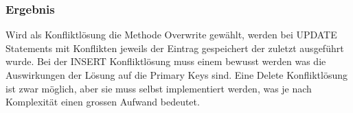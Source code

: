\documentclass[11pt,a4paper,parskip=half]{scrartcl}
\begin{document}
\subsubsection{Ergebnis}
Wird als Konfliktlösung die Methode Overwrite gewählt, werden bei UPDATE Statements mit Konflikten jeweils der Eintrag gespeichert der zuletzt ausgeführt wurde. Bei der INSERT Konfliktlösung muss einem bewusst werden was die Auswirkungen der Lösung auf die Primary Keys sind. Eine Delete Konfliktlösung ist zwar möglich, aber sie muss selbst implementiert werden, was je nach Komplexität einen grossen Aufwand bedeutet.
\end{document}
